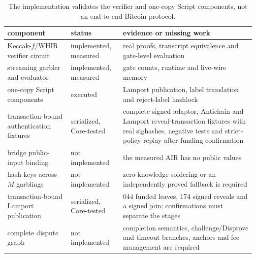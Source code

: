 \documentclass[11pt]{article}
\begin{document}
\begin{table}[t!]\centering\small
\begin{tabularx}{\textwidth}{>{\raggedright\arraybackslash}p{3.4cm}>{\raggedright\arraybackslash}p{2.2cm}>{\raggedright\arraybackslash}X}\toprule
component & status & evidence or missing work\\\midrule
Keccak-$f$/WHIR verifier circuit & implemented, measured & real proofs, transcript equivalence and gate-level evaluation\\
streaming garbler and evaluator & implemented, measured & gate counts, runtime and live-wire memory\\
one-copy Script components & executed & Lamport publication, label translation and reject-label hashlock\\
transaction-bound authentication fixtures & serialized, Core-tested & complete signed adaptor, Antichain and Lamport reveal-transaction fixtures with real sighashes, negative tests and strict-policy replay after funding confirmation\\
bridge public-input binding & not implemented & the measured AIR has no public values\\
hash keys across $M$ garblings & not implemented & zero-knowledge soldering or an independently proved fallback is required\\
transaction-bound Lamport publication & serialized, Core-tested & 1{,}044 funded leaves, 174 signed reveals and a signed join; confirmations must separate the stages\\
complete dispute graph & not implemented & completion semantics, challenge/Disprove and timeout branches, anchors and fee management are required\\\bottomrule
\end{tabularx}
\caption{The implementation validates the verifier and one-copy Script
components, not an end-to-end Bitcoin protocol.}
\label{tab:status}
\end{table}
\end{document}
